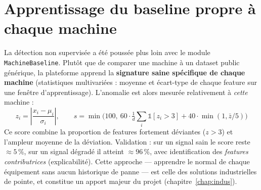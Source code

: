 \section{Apprentissage du baseline propre à chaque machine}
La détection non supervisée a été poussée plus loin avec le module \texttt{MachineBaseline}.
Plutôt que de comparer une machine à un dataset public générique, la plateforme apprend la
\textbf{signature saine spécifique de chaque machine} (statistiques multivariées : moyenne
et écart-type de chaque feature sur une fenêtre d'apprentissage). L'anomalie est alors
mesurée relativement à \emph{cette} machine :
\begin{equation}
z_i = \left|\frac{x_i - \mu_i}{\sigma_i}\right|, \qquad
s = \min\!\Big(100,\ 60\cdot \tfrac{1}{d}\textstyle\sum_i \mathbb{1}[z_i>3]
   + 40\cdot \min(1, \bar{z}/5)\Big)
\end{equation}
Ce score combine la proportion de features fortement déviantes ($z>3$) et l'ampleur moyenne
de la déviation. Validation : sur un signal sain le score reste $\approx 5\,\%$, sur un
signal dégradé il atteint $\approx 96\,\%$, avec identification des \emph{features
contributrices} (explicabilité). Cette approche --- apprendre le \og normal \fg{} de chaque
équipement sans aucun historique de panne --- est celle des solutions industrielles de
pointe, et constitue un apport majeur du projet (chapitre~\ref{chap:indus}).
